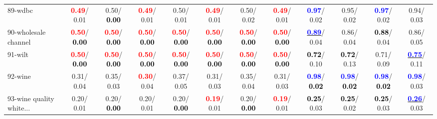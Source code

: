 \begin{table}[h]
\begin{center}
{\begin{tabular}{lc|c|c|c|c|c|c|c|c|c|c}
89-wdbc & \textcolor{red}{\textbf{  0.49}}/  0.01 &   0.50/\textcolor{black}{\textbf{  0.00}} & \textcolor{red}{\textbf{  0.49}}/  0.01 &   0.50/  0.01 & \textcolor{red}{\textbf{  0.49}}/  0.01 &   0.50/  0.02 & \textcolor{red}{\textbf{  0.49}}/  0.01 & \textcolor{blue}{\textbf{  0.97}}/  0.02 &   0.95/  0.02 & \textcolor{blue}{\textbf{  0.97}}/  0.02 &   0.94/  0.03 \\
90-wholesale channel & \textcolor{red}{\textbf{  0.50}}/\textcolor{black}{\textbf{  0.00}} & \textcolor{red}{\textbf{  0.50}}/\textcolor{black}{\textbf{  0.00}} & \textcolor{red}{\textbf{  0.50}}/\textcolor{black}{\textbf{  0.00}} & \textcolor{red}{\textbf{  0.50}}/\textcolor{black}{\textbf{  0.00}} & \textcolor{red}{\textbf{  0.50}}/\textcolor{black}{\textbf{  0.00}} & \textcolor{red}{\textbf{  0.50}}/\textcolor{black}{\textbf{  0.00}} & \textcolor{red}{\textbf{  0.50}}/\textcolor{black}{\textbf{  0.00}} & \underline{\textcolor{blue}{\textbf{  0.89}}}/  0.04 &   0.86/  0.04 & \textcolor{black}{\textbf{  0.88}}/  0.04 &   0.86/  0.05 \\
91-wilt & \textcolor{red}{\textbf{  0.50}}/\textcolor{black}{\textbf{  0.00}} & \textcolor{red}{\textbf{  0.50}}/\textcolor{black}{\textbf{  0.00}} & \textcolor{red}{\textbf{  0.50}}/\textcolor{black}{\textbf{  0.00}} & \textcolor{red}{\textbf{  0.50}}/\textcolor{black}{\textbf{  0.00}} & \textcolor{red}{\textbf{  0.50}}/\textcolor{black}{\textbf{  0.00}} & \textcolor{red}{\textbf{  0.50}}/\textcolor{black}{\textbf{  0.00}} & \textcolor{red}{\textbf{  0.50}}/\textcolor{black}{\textbf{  0.00}} & \textcolor{black}{\textbf{  0.72}}/  0.10 & \textcolor{black}{\textbf{  0.72}}/  0.13 &   0.71/  0.09 & \underline{\textcolor{blue}{\textbf{  0.75}}}/  0.11 \\
92-wine &   0.31/  0.04 &   0.35/  0.03 & \textcolor{red}{\textbf{  0.30}}/  0.04 &   0.37/  0.05 &   0.31/  0.03 &   0.35/  0.04 &   0.31/  0.03 & \textcolor{blue}{\textbf{  0.98}}/\textcolor{black}{\textbf{  0.02}} & \textcolor{blue}{\textbf{  0.98}}/\textcolor{black}{\textbf{  0.02}} & \textcolor{blue}{\textbf{  0.98}}/\textcolor{black}{\textbf{  0.02}} & \textcolor{blue}{\textbf{  0.98}}/  0.03 \\ \hline
93-wine quality white... &   0.20/  0.01 &   0.20/\textcolor{black}{\textbf{  0.00}} &   0.20/  0.01 &   0.20/\textcolor{black}{\textbf{  0.00}} & \textcolor{red}{\textbf{  0.19}}/  0.01 &   0.20/\textcolor{black}{\textbf{  0.00}} & \textcolor{red}{\textbf{  0.19}}/  0.01 & \textcolor{black}{\textbf{  0.25}}/  0.03 & \textcolor{black}{\textbf{  0.25}}/  0.02 & \textcolor{black}{\textbf{  0.25}}/  0.03 & \underline{\textcolor{blue}{\textbf{  0.26}}}/  0.03 \\

\end{tabular}}
\end{center}
\end{table}
